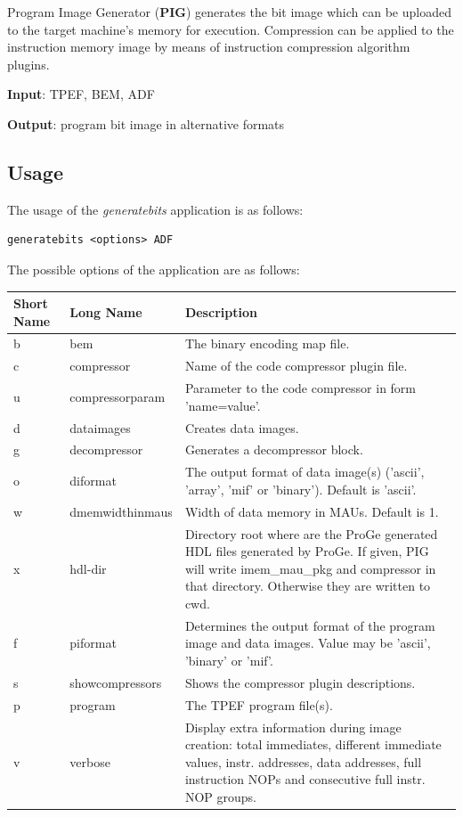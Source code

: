 \documentclass[twoside]{tceusermanual}
\begin{document}
Program Image Generator (\textbf{PIG}) generates the bit image which can be
uploaded to the target machine's memory for execution. Compression can be
applied to the instruction memory image by means of instruction compression
algorithm plugins.

\textbf{Input}: TPEF, BEM, ADF

\textbf{Output}: program bit image in alternative formats

\subsection{Usage}

The usage of the \emph{generatebits} application is as follows:

\begin{verbatim}
generatebits <options> ADF
\end{verbatim}

The possible options of the application are as follows:\\

\begin{tabular}{p{}p{}
                p{}}
\textbf{Short Name} &\textbf{Long Name} &\textbf{Description} \\
\hline
b & bem         & The binary encoding map file.\\
c & compressor  & Name of the code compressor plugin file.\\
u & compressorparam & Parameter to the code compressor in form 'name=value'. \\
d & dataimages  & Creates data images.\\
g & decompressor & Generates a decompressor block. \\
o & diformat & The output format of data image(s) ('ascii', 'array', 'mif'
or 'binary'). Default is 'ascii'. \\
w & dmemwidthinmaus & Width of data memory in MAUs. Default is 1. \\
x & hdl-dir & Directory root where are the ProGe generated HDL files
generated by ProGe. If given, PIG will write imem\_mau\_pkg and compressor
in that directory. Otherwise they are written to cwd.\\
f & piformat & Determines the output format of the program image and data
images. Value may be 'ascii', 'binary' or 'mif'.\\
s & showcompressors & Shows the compressor plugin descriptions. \\
p & program & The TPEF program file(s).\\
v & verbose & Display extra information during image creation: total 
immediates, different immediate values, instr. addresses, data addresses,
full instruction NOPs and consecutive full instr. NOP groups.\\
\end{tabular}\\
\end{document}
